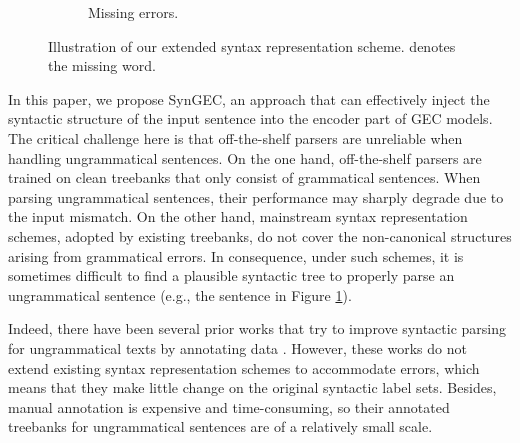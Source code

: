 \documentclass[11pt]{article}
\begin{document}
\begin{figure*}[th!]
\begin{subfigure}[b]{0.2\textwidth}
{\begin{dependency}
{      
        }
    \end{dependency}
    }
    \caption{Missing errors.}
    \label{fig:m-error}
  \end{subfigure}
  \hfill
  \caption{Illustration of our extended syntax representation scheme.  denotes the missing word.}
  \label{fig:scheme-three-error-types}
\end{figure*} 
In this paper, we propose SynGEC, an approach that can effectively inject the syntactic structure of the input sentence into the encoder part of GEC models. 
The critical challenge here is that 
off-the-shelf parsers are unreliable when handling ungrammatical sentences. 
On the one hand, 
off-the-shelf parsers are trained on clean treebanks that only consist of  grammatical sentences. When parsing ungrammatical sentences, their performance may sharply degrade due to the input mismatch. 
On the other hand, mainstream syntax representation schemes, adopted by existing treebanks, do not cover the non-canonical structures arising from grammatical errors.
In consequence, under such schemes, it is sometimes difficult to find a plausible syntactic tree to properly parse an ungrammatical sentence (e.g., the sentence in Figure \ref{fig:m-error}).




Indeed, there have been several prior works that try to improve syntactic parsing for ungrammatical texts by annotating data  \citep{dickinson2009dependency,DBLP:conf/acl/BerzakKSWLMGK16,nagata2016phrase}. 
However, these works do not extend 
existing syntax representation schemes to accommodate errors, which means that they make little change on the original syntactic label sets. 
Besides, manual annotation is expensive and time-consuming, so their annotated treebanks for ungrammatical sentences are of a relatively small scale. 
\end{document}
